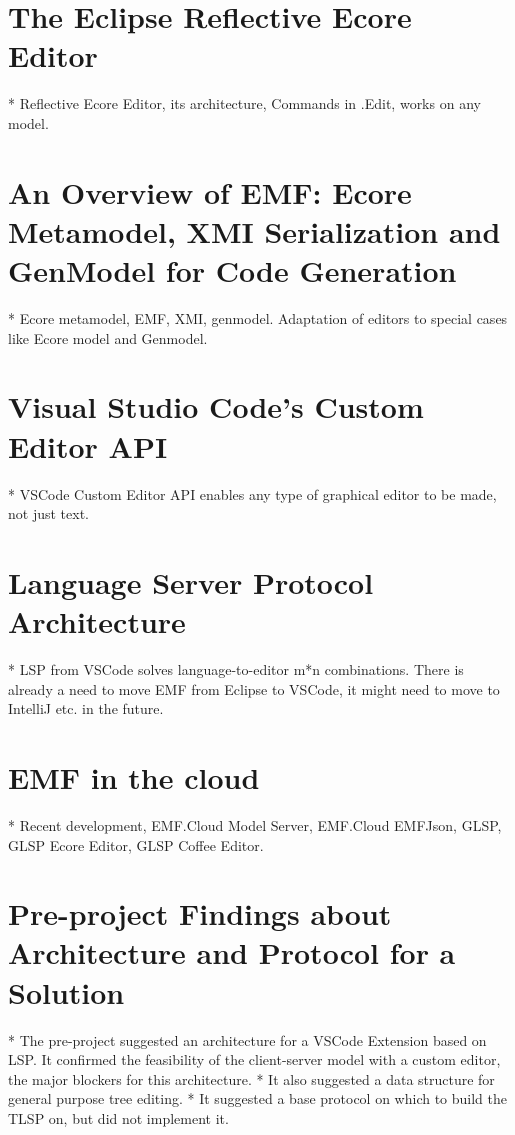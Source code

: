 \section{The Eclipse Reflective Ecore Editor}

* Reflective Ecore Editor, its architecture, Commands in .Edit, works on any model.

\section{An Overview of EMF: Ecore Metamodel, XMI Serialization and GenModel for Code Generation}\label{sec:emf-metamodel}

* Ecore metamodel, EMF, XMI, genmodel. Adaptation of editors to special cases like Ecore model and Genmodel.

\section{Visual Studio Code's Custom Editor API}

* VSCode Custom Editor API enables any type of graphical editor to be made, not just text.

\section{Language Server Protocol Architecture}

* LSP from VSCode solves language-to-editor m*n combinations. There is already a need to move EMF from Eclipse to VSCode, it might need to move to IntelliJ etc. in the future.

\section{\acrlong{EMF} in the \Gls{cloud}}

* Recent development, EMF.Cloud Model Server, EMF.Cloud EMFJson, GLSP, GLSP Ecore Editor, GLSP Coffee Editor.

\section{Pre-project Findings about Architecture and Protocol for a Solution}

* The pre-project suggested an architecture for a VSCode Extension based on LSP. It confirmed the feasibility of the client-server model with a custom editor, the major blockers for this architecture.
  * It also suggested a data structure for general purpose tree editing.
  * It suggested a base protocol on which to build the TLSP on, but did not implement it.

